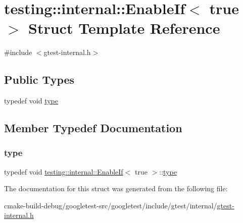 \hypertarget{structtesting_1_1internal_1_1EnableIf_3_01true_01_4}{}\section{testing\+::internal\+::Enable\+If$<$ true $>$ Struct Template Reference}
\label{structtesting_1_1internal_1_1EnableIf_3_01true_01_4}


{\ttfamily \#include $<$gtest-\/internal.\+h$>$}

\subsection*{Public Types}
\begin{DoxyCompactItemize}
\item 
typedef void \mbox{\hyperlink{structtesting_1_1internal_1_1EnableIf_3_01true_01_4_a9398d803f1fdd99ff41823746f6299ff}{type}}
\end{DoxyCompactItemize}


\subsection{Member Typedef Documentation}
\mbox{\label{structtesting_1_1internal_1_1EnableIf_3_01true_01_4_a9398d803f1fdd99ff41823746f6299ff}} 
\subsubsection{\texorpdfstring{type}{type}}
{\footnotesize\ttfamily typedef void \mbox{\hyperlink{structtesting_1_1internal_1_1EnableIf}{testing\+::internal\+::\+Enable\+If}}$<$ true $>$\+::\mbox{\hyperlink{structtesting_1_1internal_1_1EnableIf_3_01true_01_4_a9398d803f1fdd99ff41823746f6299ff}{type}}}



The documentation for this struct was generated from the following file\+:\begin{DoxyCompactItemize}
\item 
cmake-\/build-\/debug/googletest-\/src/googletest/include/gtest/internal/\mbox{\hyperlink{gtest-internal_8h}{gtest-\/internal.\+h}}\end{DoxyCompactItemize}
